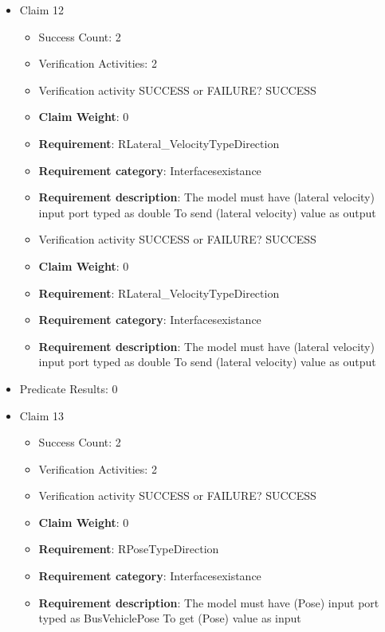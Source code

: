 \documentclass{article}
\begin{document}
\begin{itemize}
  				  \item Claim 12
				\begin{itemize}
			    	\item Success Count: 2 
			    	\item Verification Activities: 2
					\item Verification activity SUCCESS or FAILURE? SUCCESS
					\item \textbf{Claim Weight}: 0
						\item \textbf{Requirement}: RLateral_VelocityTypeDirection 
						\item \textbf{Requirement category}: Interfacesexistance 
						\item \textbf{Requirement description}: The model must have (lateral velocity) input port typed as double To send (lateral velocity) value as output
					
					\item Verification activity SUCCESS or FAILURE? SUCCESS
					\item \textbf{Claim Weight}: 0
						\item \textbf{Requirement}: RLateral_VelocityTypeDirection 
						\item \textbf{Requirement category}: Interfacesexistance 
						\item \textbf{Requirement description}: The model must have (lateral velocity) input port typed as double To send (lateral velocity) value as output
					
				\end{itemize}
				
									    
				\item Predicate Results: 0

  				  \item Claim 13
				\begin{itemize}
			    	\item Success Count: 2 
			    	\item Verification Activities: 2
					\item Verification activity SUCCESS or FAILURE? SUCCESS
					\item \textbf{Claim Weight}: 0
						\item \textbf{Requirement}: RPoseTypeDirection 
						\item \textbf{Requirement category}: Interfacesexistance 
						\item \textbf{Requirement description}: The model must have (Pose) input port typed as BusVehiclePose To get (Pose) value as input
					

\end{itemize}
\end{itemize}
\end{document}
